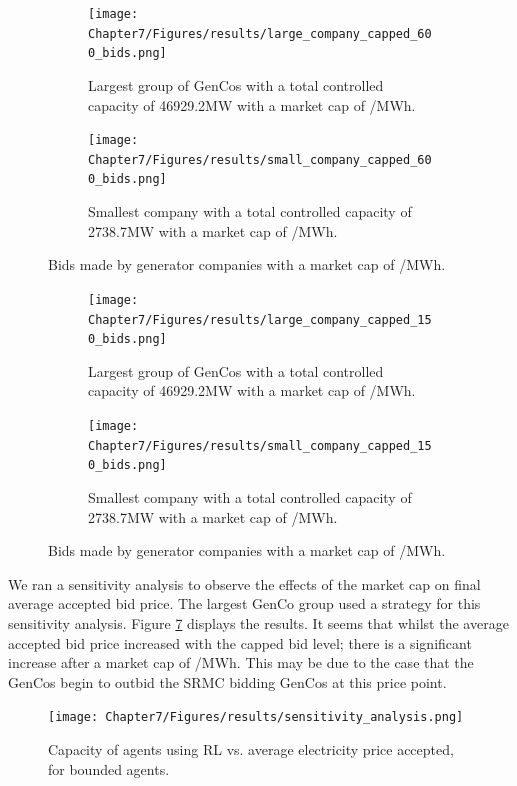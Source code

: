 \begin{figure}
	\centering
	\begin{subfigure}{0.6\textwidth}   
		\texttt{[image: Chapter7/Figures/results/large\_company\_capped\_600\_bids.png]}
		\caption{Largest group of GenCos with a total controlled capacity of 46929.2MW with a market cap of /MWh.}
		\label{fig:large_company_capped_600_bids}
	\end{subfigure}
	\hfil
	\begin{subfigure}{0.6\textwidth}   
		\texttt{[image: Chapter7/Figures/results/small\_company\_capped\_600\_bids.png]}
		\caption{Smallest company with a total controlled capacity of 2738.7MW with a market cap of /MWh.}
		\label{fig:small_company_capped_600_bids}
	\end{subfigure}
	\caption{Bids made by generator companies with a market cap of /MWh.}
	\label{fig:capped_600_bids}
\end{figure}




\begin{figure}
	\centering
	\begin{subfigure}{0.9\textwidth}  
	\centering 
		\texttt{[image: Chapter7/Figures/results/large\_company\_capped\_150\_bids.png]}
		\caption{Largest group of GenCos with a total controlled capacity of 46929.2MW with a market cap of /MWh.}
		\label{fig:large_company_capped_150_bids}
	\end{subfigure}
	\hfil
	\begin{subfigure}{0.9\textwidth} 
	\centering  
		\texttt{[image: Chapter7/Figures/results/small\_company\_capped\_150\_bids.png]}
		\caption{Smallest company with a total controlled capacity of 2738.7MW with a market cap of /MWh.}
		\label{fig:small_company_capped_150_bids}
	\end{subfigure}
	\caption{Bids made by generator companies with a market cap of /MWh.}
	\label{fig:capped_150_bids}
\end{figure}

We ran a sensitivity analysis to observe the effects of the market cap on final average accepted bid price. The largest GenCo group used a strategy for this sensitivity analysis. Figure \ref{fig:sensitivity_analysis} displays the results. It seems that whilst the average accepted bid price increased with the capped bid level; there is a significant increase after a market cap of /MWh. This may be due to the case that the GenCos begin to outbid the SRMC bidding GenCos at this price point.
\begin{figure}
	\centering
	\texttt{[image: Chapter7/Figures/results/sensitivity\_analysis.png]}
	\caption{Capacity of agents using RL vs. average electricity price accepted, for bounded agents.}
	\label{fig:sensitivity_analysis}
\end{figure}





